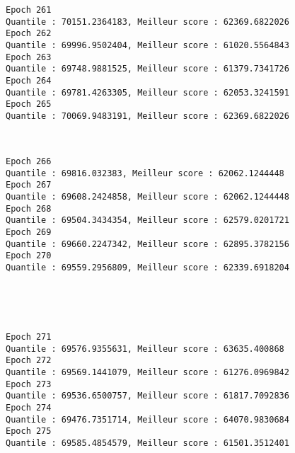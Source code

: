 \documentclass[11pt]{article}
\begin{document}
    \begin{Verbatim}[commandchars=\\\{\}]
Epoch 261
Quantile : 70151.2364183, Meilleur score : 62369.6822026
Epoch 262
Quantile : 69996.9502404, Meilleur score : 61020.5564843
Epoch 263
Quantile : 69748.9881525, Meilleur score : 61379.7341726
Epoch 264
Quantile : 69781.4263305, Meilleur score : 62053.3241591
Epoch 265
Quantile : 70069.9483191, Meilleur score : 62369.6822026

    \end{Verbatim}

    \begin{center}
    \end{center}
    { \hspace*{\fill} \\}
    
    \begin{Verbatim}[commandchars=\\\{\}]
Epoch 266
Quantile : 69816.032383, Meilleur score : 62062.1244448
Epoch 267
Quantile : 69608.2424858, Meilleur score : 62062.1244448
Epoch 268
Quantile : 69504.3434354, Meilleur score : 62579.0201721
Epoch 269
Quantile : 69660.2247342, Meilleur score : 62895.3782156
Epoch 270
Quantile : 69559.2956809, Meilleur score : 62339.6918204

    \end{Verbatim}

    \begin{center}
    \end{center}
    { \hspace*{\fill} \\}
    
    \begin{center}
    \end{center}
    { \hspace*{\fill} \\}
    
    \begin{Verbatim}[commandchars=\\\{\}]
Epoch 271
Quantile : 69576.9355631, Meilleur score : 63635.400868
Epoch 272
Quantile : 69569.1441079, Meilleur score : 61276.0969842
Epoch 273
Quantile : 69536.6500757, Meilleur score : 61817.7092836
Epoch 274
Quantile : 69476.7351714, Meilleur score : 64070.9830684
Epoch 275
Quantile : 69585.4854579, Meilleur score : 61501.3512401

    \end{Verbatim}
\end{document}
